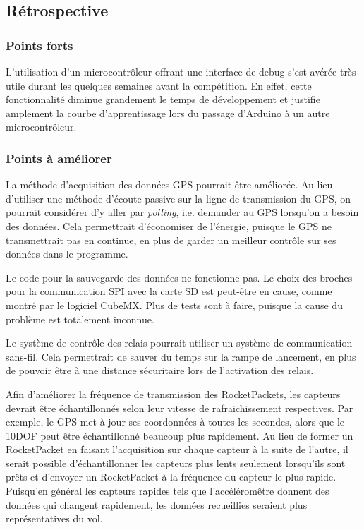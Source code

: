 \subsection{Rétrospective}

\subsubsection{Points forts}

L'utilisation d'un microcontrôleur offrant une interface de debug s'est avérée
très utile durant les quelques semaines avant la compétition. En effet, cette
fonctionnalité diminue grandement le temps de développement et justifie
amplement la courbe d'apprentissage lors du passage d'Arduino à un autre
microcontrôleur.

\subsubsection{Points à améliorer}

La méthode d'acquisition des données GPS pourrait être améliorée. Au lieu
d'utiliser une méthode d'écoute passive sur la ligne de transmission du GPS, on
pourrait considérer d'y aller par \textit{polling}, i.e. demander au GPS
lorsqu'on a besoin des données. Cela permettrait d'économiser de l'énergie,
puisque le GPS ne transmettrait pas en continue, en plus de garder un meilleur
contrôle sur ses données dans le programme.
\\
\par
Le code pour la sauvegarde des données ne fonctionne pas. Le choix des broches
pour la communication SPI avec la carte SD est peut-être en cause, comme montré
par le logiciel CubeMX. Plus de tests sont à faire, puisque la cause du
problème est totalement inconnue.
\\
\par
Le système de contrôle des relais pourrait utiliser un système de communication
sans-fil. Cela permettrait de sauver du temps sur la rampe de lancement, en
plus de pouvoir être à une distance sécuritaire lors de l'activation des relais.
\\
\par
Afin d'améliorer la fréquence de transmission des RocketPackets, les capteurs
devrait être échantillonnés selon leur vitesse de rafraichissement respectives.
Par exemple, le GPS met à jour ses coordonnées à toutes les secondes, alors que
le 10DOF peut être échantillonné beaucoup plus rapidement. Au lieu de former un
RocketPacket en faisant l'acquisition sur chaque capteur à la suite de l'autre,
il serait possible d'échantillonner les capteurs plus lents seulement
lorsqu'ils sont prêts et d'envoyer un RocketPacket à la fréquence du capteur le
plus rapide. Puisqu'en général les capteurs rapides tels que l'accéléromêtre
donnent des données qui changent rapidement, les données recueillies seraient
plus représentatives du vol.
